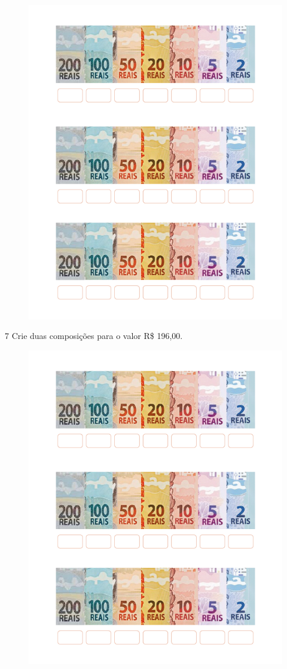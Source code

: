 \begin{figure}[htpb!]
\includegraphics[width=.8\textwidth]{./media/image67.png}
\end{figure}



\pagebreak
\num{7} Crie duas composições para o valor R\$ 196,00.

\begin{figure}[htpb!]
\includegraphics[width=.9\textwidth]{./media/image68.png}
\end{figure}

